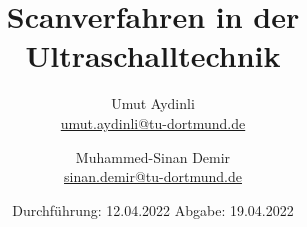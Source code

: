

\subject{US2}
\title{Scanverfahren in der Ultraschalltechnik}
\author{Umut Aydinli \\
 \href{mailto:umut.aydinli@tu-dortmund.de}{umut.aydinli@tu-dortmund.de}
 \and Muhammed-Sinan Demir \\
 \href{mailto:sinan.demir@tu-dortmund.de}{sinan.demir@tu-dortmund.de}
 }
\date{
  Durchführung: 12.04.2022
  \hspace{3em}
  Abgabe: 19.04.2022
}




\maketitle
\tableofcontents
\newpage









\nocite{*}
\printbibliography{}

